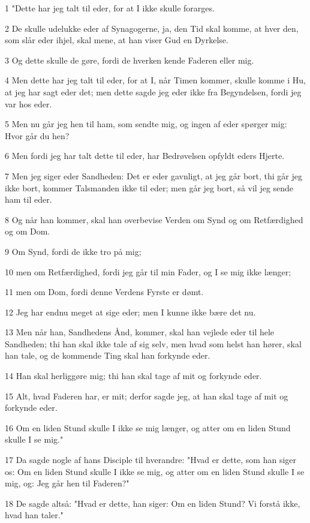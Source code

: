 \par 1 "Dette har jeg talt til eder, for at I ikke skulle forarges.
\par 2 De skulle udelukke eder af Synagogerne, ja, den Tid skal komme, at hver den, som slår eder ihjel, skal mene, at han viser Gud en Dyrkelse.
\par 3 Og dette skulle de gøre, fordi de hverken kende Faderen eller mig.
\par 4 Men dette har jeg talt til eder, for at I, når Timen kommer, skulle komme i Hu, at jeg har sagt eder det; men dette sagde jeg eder ikke fra Begyndelsen, fordi jeg var hos eder.
\par 5 Men nu går jeg hen til ham, som sendte mig, og ingen af eder spørger mig: Hvor går du hen?
\par 6 Men fordi jeg har talt dette til eder, har Bedrøvelsen opfyldt eders Hjerte.
\par 7 Men jeg siger eder Sandheden: Det er eder gavnligt, at jeg går bort, thi går jeg ikke bort, kommer Talsmanden ikke til eder; men går jeg bort, så vil jeg sende ham til eder.
\par 8 Og når han kommer, skal han overbevise Verden om Synd og om Retfærdighed og om Dom.
\par 9 Om Synd, fordi de ikke tro på mig;
\par 10 men om Retfærdighed, fordi jeg går til min Fader, og I se mig ikke længer;
\par 11 men om Dom, fordi denne Verdens Fyrste er dømt.
\par 12 Jeg har endnu meget at sige eder; men I kunne ikke bære det nu.
\par 13 Men når han, Sandhedens Ånd, kommer, skal han vejlede eder til hele Sandheden; thi han skal ikke tale af sig selv, men hvad som helst han hører, skal han tale, og de kommende Ting skal han forkynde eder.
\par 14 Han skal herliggøre mig; thi han skal tage af mit og forkynde eder.
\par 15 Alt, hvad Faderen har, er mit; derfor sagde jeg, at han skal tage af mit og forkynde eder.
\par 16 Om en liden Stund skulle I ikke se mig længer, og atter om en liden Stund skulle I se mig."
\par 17 Da sagde nogle af hans Disciple til hverandre: "Hvad er dette, som han siger os: Om en liden Stund skulle I ikke se mig, og atter om en liden Stund skulle I se mig, og: Jeg går hen til Faderen?"
\par 18 De sagde altså: "Hvad er dette, han siger: Om en liden Stund? Vi forstå ikke, hvad han taler."
